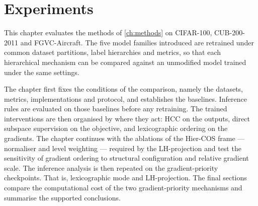 \chapter{Experiments}
\label{ch:experiments}

This chapter evaluates the methods of \cref{ch:methods} on CIFAR-100,
CUB-200-2011 and FGVC-Aircraft. The five model families introduced are retrained
under common dataset partitions, label hierarchies and metrics, so that each hierarchical
mechanism can be compared against an unmodified model trained
under the same settings.

The chapter first fixes the conditions of the comparison, namely the datasets,
metrics, implementations and protocol, and establishes the baselines. Inference
rules are evaluated on those baselines before any retraining. The trained
interventions are then organised by where they act: HCC on the outputs, direct
subspace supervision on the objective, and lexicographic ordering on the
gradients. The chapter continues with the ablations of the Hier-COS frame --- normaliser and level weighting ---
required by the LH-projection and test the sensitivity
of gradient ordering to structural configuration and relative gradient scale.
The inference analysis is then repeated on the gradient-priority checkpoints. That is,
lexicographic mode and LH-projection.
The final sections compare the computational cost of the two gradient-priority
mechanisms and summarise the supported conclusions.
%
%
%


